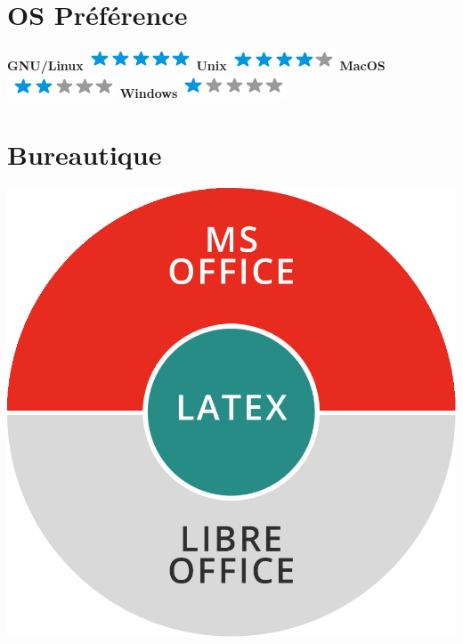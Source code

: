 \documentclass[]{friggeri-cv}
\begin{document}
\begin{aside}
  \section{OS Préférence}
    \textbf{GNU/Linux}\includegraphics[scale=0.40]{img/5stars.png}
    \textbf{Unix}\includegraphics[scale=0.40]{img/4stars.png}
    \textbf{MacOS}\includegraphics[scale=0.40]{img/2stars.png}
    \textbf{Windows}\includegraphics[scale=0.40]{img/1stars.png}
    ~
    ~
  \section{Bureautique}
    \includegraphics[scale=0.1]{img/bureautique.png}
    ~
\end{aside}
\vspace{0.42cm}
\end{document}
